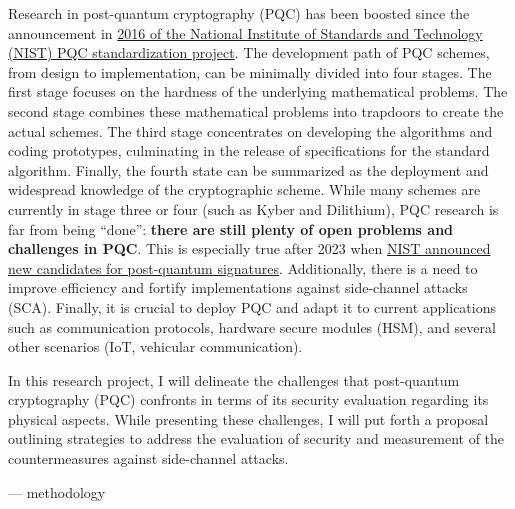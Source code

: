 
Research in post-quantum cryptography (PQC) has been boosted since the announcement in 
\href{https://csrc.nist.gov/projects/post-quantum-cryptography/post-quantum-cryptography-standardization/call-for-proposals}
{2016 of the National Institute of Standards and Technology (NIST) PQC standardization project}. The development path of 
PQC schemes, from design to implementation, can be minimally divided into four stages. The first 
stage focuses on the hardness of the underlying mathematical problems. The second stage combines 
these mathematical problems into trapdoors to create the actual schemes. The third stage 
concentrates on developing the algorithms and coding prototypes, culminating in the 
release of specifications for the standard algorithm. Finally, the fourth state can be 
summarized as the deployment and widespread knowledge of the cryptographic scheme. 
While many schemes are currently in stage three or four (such as Kyber and Dilithium), 
PQC research is far from being ``done'': 
\textbf{there are still plenty of open problems and challenges in PQC}. 
This is especially true after 2023 when
 \href{https://www.nist.gov/news-events/news/2023/07/nist-announces-additional-digital-signature-candidates-pqc-standardization}
 {NIST announced new candidates for post-quantum signatures}. Additionally, there is a need to improve efficiency and fortify 
 implementations against side-channel attacks (SCA). Finally, it is crucial to deploy PQC and adapt it to 
 current applications such as communication protocols, hardware secure modules (HSM), and several other
  scenarios (IoT, vehicular communication).

In this research project, I will delineate the challenges that post-quantum cryptography (PQC) confronts in terms of its 
security evaluation regarding its physical aspects. While presenting these challenges, I will put forth a 
proposal outlining strategies to address the evaluation of security and measurement of the countermeasures against side-channel 
attacks. 


---
methodology

